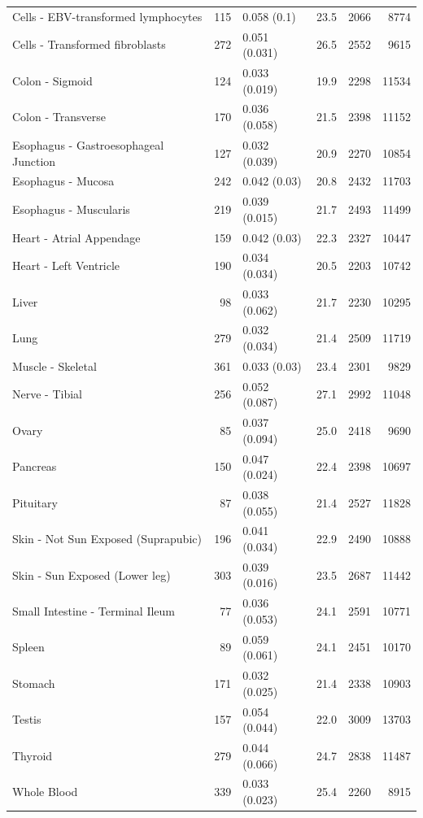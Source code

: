 \documentclass[10pt,letterpaper]{article}
\begin{document}
\begin{table}[!ht]
\begin{adjustwidth}{-2.25in}{0in}
\begin{tabular}{lrlrrr}
  Cells - EBV-transformed lymphocytes & 115 & 0.058 (0.1) & 23.5 & 2066 & 8774 \\ 
  Cells - Transformed fibroblasts & 272 & 0.051 (0.031) & 26.5 & 2552 & 9615 \\ 
  Colon - Sigmoid & 124 & 0.033 (0.019) & 19.9 & 2298 & 11534 \\ 
  Colon - Transverse & 170 & 0.036 (0.058) & 21.5 & 2398 & 11152 \\ 
  Esophagus - Gastroesophageal Junction & 127 & 0.032 (0.039) & 20.9 & 2270 & 10854 \\ 
  Esophagus - Mucosa & 242 & 0.042 (0.03) & 20.8 & 2432 & 11703 \\ 
  Esophagus - Muscularis & 219 & 0.039 (0.015) & 21.7 & 2493 & 11499 \\ 
  Heart - Atrial Appendage & 159 & 0.042 (0.03) & 22.3 & 2327 & 10447 \\ 
  Heart - Left Ventricle & 190 & 0.034 (0.034) & 20.5 & 2203 & 10742 \\ 
  Liver & 98 & 0.033 (0.062) & 21.7 & 2230 & 10295 \\ 
  Lung & 279 & 0.032 (0.034) & 21.4 & 2509 & 11719 \\ 
  Muscle - Skeletal & 361 & 0.033 (0.03) & 23.4 & 2301 & 9829 \\ 
  Nerve - Tibial & 256 & 0.052 (0.087) & 27.1 & 2992 & 11048 \\ 
  Ovary & 85 & 0.037 (0.094) & 25.0 & 2418 & 9690 \\ 
  Pancreas & 150 & 0.047 (0.024) & 22.4 & 2398 & 10697 \\ 
  Pituitary & 87 & 0.038 (0.055) & 21.4 & 2527 & 11828 \\ 
  Skin - Not Sun Exposed (Suprapubic) & 196 & 0.041 (0.034) & 22.9 & 2490 & 10888 \\ 
  Skin - Sun Exposed (Lower leg) & 303 & 0.039 (0.016) & 23.5 & 2687 & 11442 \\ 
  Small Intestine - Terminal Ileum & 77 & 0.036 (0.053) & 24.1 & 2591 & 10771 \\ 
  Spleen & 89 & 0.059 (0.061) & 24.1 & 2451 & 10170 \\ 
  Stomach & 171 & 0.032 (0.025) & 21.4 & 2338 & 10903 \\ 
  Testis & 157 & 0.054 (0.044) & 22.0 & 3009 & 13703 \\ 
  Thyroid & 279 & 0.044 (0.066) & 24.7 & 2838 & 11487 \\ 
  Whole Blood & 339 & 0.033 (0.023) & 25.4 & 2260 & 8915 \\ 
   \hline
\end{tabular}

\end{adjustwidth}
\end{table}
\end{document}
